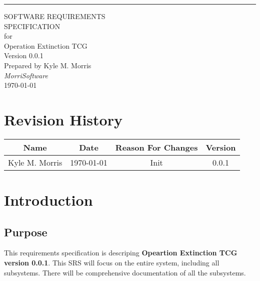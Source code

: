 \documentclass{scrreprt}
\date{}
\def\myversion{0.0.1}
\def\myname{Kyle M. Morris }
\def\orgname{\textit{MorriSoftware} }
\begin{document}
\begin{flushright}
    \rule{16cm}{5pt}\vskip1cm
    \begin{bfseries}
        \Huge{SOFTWARE REQUIREMENTS\\ SPECIFICATION}\\
        \vspace{1.0cm}
        for\\
        \vspace{1.0cm}
        Operation Extinction TCG\\
        \vspace{1.9cm}
        \LARGE{Version \myversion}\\
        \vspace{1.9cm}
        Prepared by \myname\\
        \vspace{1.9cm}
        \orgname\\
        \vspace{1.9cm}
        \today\\
    \end{bfseries}
\end{flushright}

\tableofcontents


\chapter*{Revision History}

\begin{center}
    \begin{tabular}{|c|c|c|c|}
        \hline
	    Name & Date & Reason For Changes & Version\\
        \hline
	    \myname & \today & Init & \myversion\\
        \hline
    \end{tabular}
\end{center}

\chapter{Introduction}

\section{Purpose}

This requirements specification is descriping \textbf{Opeartion Extinction TCG version \myversion}. This SRS will focus on the entire system, including all subsystems. There will be comprehensive documentation of all the subsystems.
\end{document}
